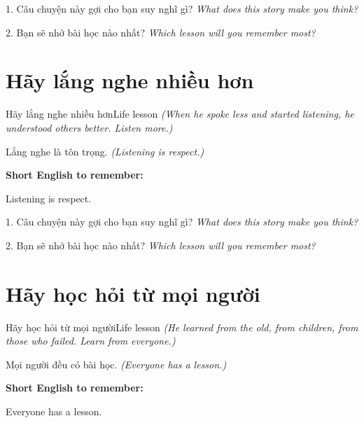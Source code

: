 \begin{tuhocnhanh}
1. Câu chuyện này gợi cho bạn suy nghĩ gì? \textit{What does this story make you think?}

2. Bạn sẽ nhớ bài học nào nhất? \textit{Which lesson will you remember most?}
\end{tuhocnhanh}
\ngancach


\section{Hãy lắng nghe nhiều hơn}
\begin{truyen}{Hãy lắng nghe nhiều hơn}{Life lesson}
\textit{(When he spoke less and started listening, he understood others better. Listen more.)}
\end{truyen}

\begin{baihoc}
Lắng nghe là tôn trọng.
\textit{(Listening is respect.)}
\end{baihoc}

\begin{ghinhoanh}
\textbf{Short English to remember:}

Listening is respect.

\end{ghinhoanh}

\begin{tuhocnhanh}
1. Câu chuyện này gợi cho bạn suy nghĩ gì? \textit{What does this story make you think?}

2. Bạn sẽ nhớ bài học nào nhất? \textit{Which lesson will you remember most?}
\end{tuhocnhanh}
\ngancach


\section{Hãy học hỏi từ mọi người}
\begin{truyen}{Hãy học hỏi từ mọi người}{Life lesson}
\textit{(He learned from the old, from children, from those who failed. Learn from everyone.)}
\end{truyen}

\begin{baihoc}
Mọi người đều có bài học.
\textit{(Everyone has a lesson.)}
\end{baihoc}

\begin{ghinhoanh}
\textbf{Short English to remember:}

Everyone has a lesson.

\end{ghinhoanh}

